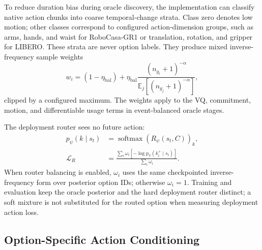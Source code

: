 To reduce duration bias during oracle discovery, the implementation can
classify native action chunks into coarse temporal-change strata.  Class zero
denotes low motion; other classes correspond to configured action-dimension
groups, such as arms, hands, and waist for RoboCasa-GR1 or translation,
rotation, and gripper for LIBERO.  These strata are never option labels.  They
produce mixed inverse-frequency sample weights
\begin{equation}
    w_i=(1-\eta_{\mathrm{bal}})+\eta_{\mathrm{bal}}
    \frac{(n_{g_i}+1)^{-\alpha}}
    {\mathbb{E}_j[(n_{g_j}+1)^{-\alpha}]},
    \label{eq:event-balance}
\end{equation}
clipped by a configured maximum.  The weights apply to the VQ, commitment,
motion, and differentiable usage terms in event-balanced oracle stages.

The deployment router sees no future action:
\begin{equation}
    \begin{aligned}
    p_\psi(k\mid s_t)
      &=\operatorname{softmax}(R_\psi(s_t,C))_k,\\
    \mathcal{L}_{R}
      &=\frac{\sum_i \omega_i[-\log p_\psi(k_i^+\mid s_i)]}
      {\sum_i\omega_i}.
    \end{aligned}
    \label{eq:router-loss}
\end{equation}
When router balancing is enabled, \(\omega_i\) uses the same checkpointed
inverse-frequency form over posterior option IDs; otherwise \(\omega_i=1\).
Training and evaluation keep the oracle posterior and the hard deployment
router distinct; a soft mixture is not substituted for the routed option when
measuring deployment action loss.

\subsection{Option-Specific Action Conditioning}

